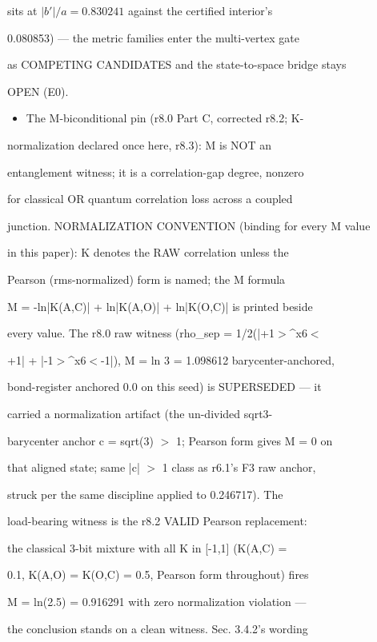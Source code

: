 \documentclass[11pt,a4paper]{article}
\theoremstyle{definition}
\begin{document}
    sits at $|b'|/a = 0.830241$ against the certified interior's

    0.080853) --- the metric families enter the multi-vertex gate

    as COMPETING CANDIDATES and the state-to-space bridge stays

    OPEN (E0).

\begin{itemize}[leftmargin=1.4em]
\item The M-biconditional pin (r8.0 Part C, corrected r8.2; K-
\end{itemize}
    normalization declared once here, r8.3): M is NOT an

    entanglement witness; it is a correlation-gap degree, nonzero

    for classical OR quantum correlation loss across a coupled

    junction. NORMALIZATION CONVENTION (binding for every M value

    in this paper): K denotes the RAW correlation unless the

    Pearson (rms-normalized) form is named; the M formula

    M = -ln|K(A,C)| + ln|K(A,O)| + ln|K(O,C)| is printed beside

    every value. The r8.0 raw witness (rho\_sep = 1/2(|+1$>$\^{}{x6}$<$

    +1| + |-1$>$\^{}{x6}$<$-1|), M = ln 3 = 1.098612 barycenter-anchored,

    bond-register anchored 0.0 on this seed) is SUPERSEDED — it

    carried a normalization artifact (the un-divided sqrt3-

    barycenter anchor c = sqrt(3) $>$ 1; Pearson form gives M = 0 on

    that aligned state; same |c| $>$ 1 class as r6.1's F3 raw anchor,

    struck per the same discipline applied to 0.246717). The

    load-bearing witness is the r8.2 VALID Pearson replacement:

    the classical 3-bit mixture with all K in [-1,1] (K(A,C) =

    0.1, K(A,O) = K(O,C) = 0.5, Pearson form throughout) fires

    M = ln(2.5) = 0.916291 with zero normalization violation —

    the conclusion stands on a clean witness. Sec. 3.4.2's wording
\end{document}
